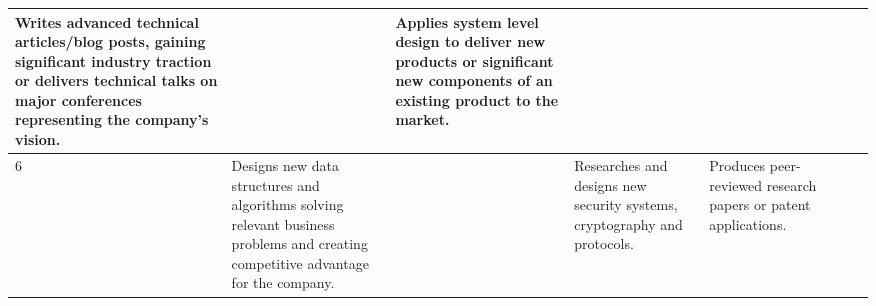\documentclass{article}
\begin{document}
\begin{center}
\begin{tabular}{ | m{15em} | m{15em} | m{15em} |  m{15em} | m{15em} |  m{15em} | m{15em} | m{15em} |}
    Writes advanced technical articles/blog posts, gaining significant industry traction or delivers technical talks on major conferences representing the company's vision.
    & &
    Applies system level design to deliver new products or significant new components of an existing product to the market.
    & \\
  \hline
    6&
    Designs new data structures and algorithms solving relevant business problems and creating competitive advantage for the company.&
    &
    Researches and designs new security systems, cryptography and protocols.&
    Produces peer-reviewed research papers or patent applications.
    & & & \\
\end{tabular}
\end{center}
\end{document}
